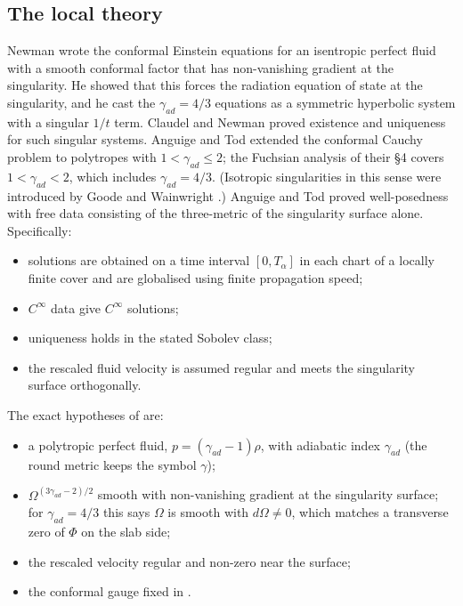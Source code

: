 \documentclass[11pt]{article}
\theoremstyle{canonmath}
\theoremstyle{canonpostulate}
\theoremstyle{canonproposition}
\theoremstyle{canonmath}
\theoremstyle{canonproposition}
\def\mathrm#1{#1}%
\begin{document}
\subsection{The local theory}

Newman \cite{Newman1993a,Newman1993b} wrote the conformal Einstein equations for an isentropic perfect fluid with a smooth conformal factor that has non-vanishing gradient at the singularity. He showed that this forces the radiation equation of state at the singularity, and he cast the $\gamma_{\mathrm{ad}} = 4/3$ equations as a symmetric hyperbolic system with a singular $1/t$ term. Claudel and Newman \cite{ClaudelNewman1998} proved existence and uniqueness for such singular systems. Anguige and Tod \cite[§4]{AnguigeTod1999a} extended the conformal Cauchy problem to polytropes with $1<\gamma_{\mathrm{ad}}\le2$; the Fuchsian analysis of their §4 covers $1<\gamma_{\mathrm{ad}}<2$, which includes $\gamma_{\mathrm{ad}} = 4/3$. (Isotropic singularities in this sense were introduced by Goode and Wainwright \cite{GoodeWainwright1985}.) Anguige and Tod proved well-posedness with free data consisting of the three-metric of the singularity surface alone. Specifically:
\begin{itemize}
\item solutions are obtained on a time interval $[0,T_\alpha]$ in each chart of a locally finite cover and are globalised using finite propagation speed;
\item $C^\infty$ data give $C^\infty$ solutions;
\item uniqueness holds in the stated Sobolev class;
\item the rescaled fluid velocity is assumed regular and meets the singularity surface orthogonally.
\end{itemize}
The exact hypotheses of \cite[§4]{AnguigeTod1999a} are:
\begin{itemize}
\item a polytropic perfect fluid, $p = (\gamma_{\mathrm{ad}}-1)\rho$, with adiabatic index $\gamma_{\mathrm{ad}}$ (the round metric keeps the symbol $\gamma$);
\item $\Omega^{(3\gamma_{\mathrm{ad}}-2)/2}$ smooth with non-vanishing gradient at the singularity surface; for $\gamma_{\mathrm{ad}} = 4/3$ this says $\Omega$ is smooth with $d\Omega\neq0$, which matches a transverse zero of $\Phi$ on the slab side;
\item the rescaled velocity regular and non-zero near the surface;
\item the conformal gauge fixed in \cite[§4.1]{AnguigeTod1999a}.
\end{itemize}
\end{document}
